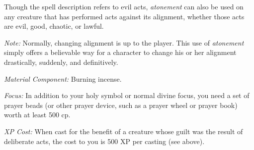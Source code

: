 {	Though the spell description refers to evil acts, \emph{atonement} can also be used on any creature that has performed acts against its alignment, whether those acts are evil, good, chaotic, or lawful.

	\textit{Note:} Normally, changing alignment is up to the player. This use of \emph{atonement} simply offers a believable way for a character to change his or her alignment drastically, suddenly, and definitively.

	\textit{Material Component:}
	Burning incense.

	\textit{Focus:}
	In addition to your holy symbol or normal divine focus, you need a set of prayer beads (or other prayer device, such as a prayer wheel or prayer book) worth at least 500 cp.

	\textit{XP Cost:}
	When cast for the benefit of a creature whose guilt was the result of deliberate acts, the cost to you is 500 XP per casting (see above).

}
